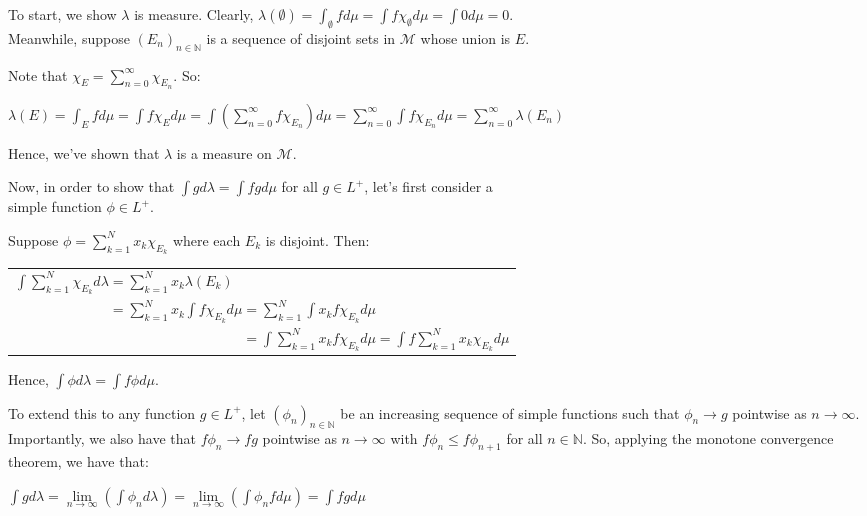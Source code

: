 \documentclass{book}
\newcommand{\exTwoP}{%
   \color{RedViolet}%
   \fontsize{13}{15}\selectfont%
}
\newenvironment{myIndent}{%
   \begin{adjustwidth}{2.5em}{0em}%
}{%
   \end{adjustwidth}%
}
\newcommand{\retTwo}{\hfill\bigbreak}
\begin{document}
\begin{myIndent}\exTwoP
   To start, we show $\lambda$ is measure. Clearly, $\lambda(\emptyset) = \int_\emptyset fd\mu = \int f\chi_{\emptyset}d\mu = \int 0d\mu = 0$.\\ Meanwhile, suppose $(E_n)_{n \in \mathbb{N}}$ is a sequence of disjoint sets in $\mathcal{M}$ whose union is $E$.\retTwo
   
   Note that $\chi_E = \sum\limits_{n = 0}^\infty \chi_{E_n}$. So:\\ [-10pt]
   
   {\centering $\lambda(E) = \int_{E} fd\mu = \int f\chi_E d\mu = \int \left(\sum\limits_{n = 0}^\infty f\chi_{E_n}\right)d\mu = \sum\limits_{n=0}^\infty \int f\chi_{E_n}d\mu = \sum\limits_{n = 0}^\infty \lambda(E_n)$\retTwo\par}

   Hence, we've shown that $\lambda$ is a measure on $\mathcal{M}$.\newpage

   Now, in order to show that $\int g d\lambda = \int fgd\mu$ for all $g \in L^+$, let's first consider a\\ simple function $\phi \in L^+$.\retTwo

   Suppose $\phi = \sum\limits_{k=1}^N x_k \chi_{E_k}$ where each $E_k$ is disjoint. Then:

   {\centering 
   \begin{tabular}{l}
      $\int \sum\limits_{k=1}^N \chi_{E_k}d\lambda = \sum\limits_{k=1}^N x_k\lambda(E_k)$\\ [10pt]
      $\phantom{\int \sum\limits_{k=1}^N \chi_{E_k}d\lambda} = \sum\limits_{k=1}^N x_k\int f\chi_{E_k}d\mu = \sum\limits_{k=1}^N \int x_k f\chi_{E_k}d\mu$\\ [10pt]
      $\phantom{\int \sum\limits_{k=1}^N \chi_{E_k}d\lambda = \sum\limits_{k=1}^N x_k\int f\chi_{E_k}d\mu} = \int \sum\limits_{k=1}^N x_k f\chi_{E_k}d\mu = \int f\sum\limits_{k=1}^N x_k \chi_{E_k}d\mu$
   \end{tabular} \retTwo\par}

   Hence, $\int \phi d\lambda = \int f \phi d\mu$.\retTwo

   To extend this to any function $g \in L^+$, let $(\phi_n)_{n \in \mathbb{N}}$ be an increasing sequence of simple functions such that $\phi_n \rightarrow g$ pointwise as $n \rightarrow \infty$. Importantly, we also have that $f\phi_n \rightarrow fg$ pointwise as $n \rightarrow \infty$ with $f\phi_{n} \leq f\phi_{n + 1}$ for all $n \in \mathbb{N}$. So, applying the monotone convergence theorem, we have that:

   {\centering $\int gd\lambda = \lim\limits_{n \rightarrow \infty}(\int \phi_nd\lambda) = \lim\limits_{n \rightarrow \infty}(\int \phi_nfd\mu) = \int fg d\mu$ \retTwo\par}
\end{myIndent}
\end{document}
